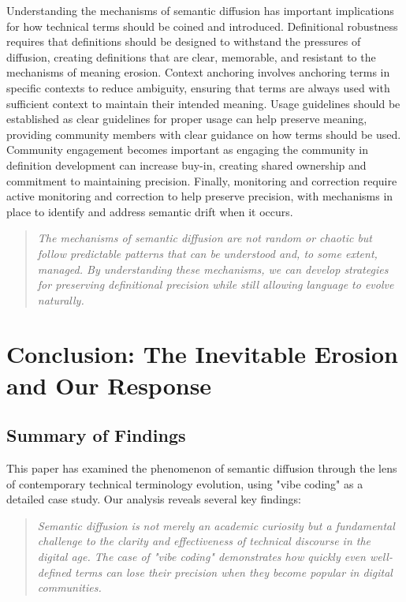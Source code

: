 \documentclass[11pt]{article}
\begin{document}
Understanding the mechanisms of semantic diffusion has important implications for how technical terms should be coined and introduced. Definitional robustness requires that definitions should be designed to withstand the pressures of diffusion, creating definitions that are clear, memorable, and resistant to the mechanisms of meaning erosion. Context anchoring involves anchoring terms in specific contexts to reduce ambiguity, ensuring that terms are always used with sufficient context to maintain their intended meaning. Usage guidelines should be established as clear guidelines for proper usage can help preserve meaning, providing community members with clear guidance on how terms should be used. Community engagement becomes important as engaging the community in definition development can increase buy-in, creating shared ownership and commitment to maintaining precision. Finally, monitoring and correction require active monitoring and correction to help preserve precision, with mechanisms in place to identify and address semantic drift when it occurs.

\begin{quote}
\emph{The mechanisms of semantic diffusion are not random or chaotic but follow predictable patterns that can be understood and, to some extent, managed. By understanding these mechanisms, we can develop strategies for preserving definitional precision while still allowing language to evolve naturally.}
\end{quote}

\section{Conclusion: The Inevitable Erosion and Our Response}

\subsection{Summary of Findings}

This paper has examined the phenomenon of semantic diffusion through the lens of contemporary technical terminology evolution, using "vibe coding" as a detailed case study. Our analysis reveals several key findings:

\begin{quote}
\emph{Semantic diffusion is not merely an academic curiosity but a fundamental challenge to the clarity and effectiveness of technical discourse in the digital age. The case of "vibe coding" demonstrates how quickly even well-defined terms can lose their precision when they become popular in digital communities.}
\end{quote}
\end{document}
